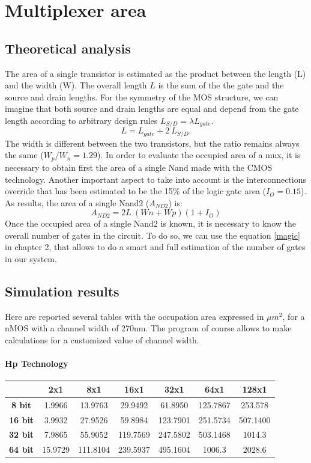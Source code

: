 \chapter{Multiplexer area}
\section{Theoretical analysis}
The area of a single transistor is estimated as the product between the length (L) and the width (W).
The overall length $L$ is the sum of the the gate and the source and drain lengths. For the symmetry of the MOS structure, we can imagine that both source and drain lengths are equal and depend from the gate length according to arbitrary design rules $L_{S/D}= \lambda L_{gate}$. 
\begin{equation}
L = L_{gate} + 2 \ L_{S/D}.
\end{equation}
 The width is different between the two transistors, but the ratio remains always the same ($W_p / W_n =1.29$). In order to evaluate the occupied area of a mux, it is necessary to obtain first the area of a single Nand made with the CMOS technology. Another important aspect to take into account is the interconnections override that has been estimated to be the 15\% of the logic gate area ($I_O=0.15$).
As results, the area of a single Nand2 ($A_{ND2}$) is:
\begin{equation}
A_{ND2}=2L \ (Wn+Wp) (1+I_O)
\end{equation}
Once the occupied area of a single Nand2 is known, it is necessary to know the overall number of gates in the circuit. To do so, we can use the equation \ref{magic} in chapter 2, that allows to do a smart and full estimation of the number of gates in our system.

\section{Simulation results}
Here are reported several tables with the occupation area expressed in $\mu m^2$, for a nMOS with a channel width of 270nm. The program of course allows to make calculations for a customized value of channel width.
\subsubsection{Hp Technology}
\begin{tabular}{|c|c|c|c|c|c|c|}
	\hline
	& \bfseries2x1 & \bfseries8x1 & \bfseries16x1 & \bfseries32x1 & \bfseries64x1 & \bfseries128x1 \\
	\hline
	\hline
	\bfseries8 bit&1.9966&13.9763&29.9492&61.8950&125.7867&253.578\\
	\hline
	\bfseries16 bit&3.9932&27.9526&59.8984&123.7901&251.5734&507.1400 \\
	\hline
	\bfseries32 bit&7.9865&55.9052&119.7569&247.5802&503.1468&1014.3 \\
	\hline
	\bfseries64 bit&15.9729&111.8104&239.5937&495.1604&1006.3& 2028.6 \\
	\hline
\end{tabular} 
